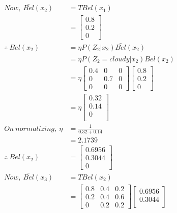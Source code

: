 \documentclass[a4paper,fleqn,11pt]{article}
\theoremstyle{mytheor}
\begin{document}
\begin{align*}
Now,\ \bar{Bel}(x_2) & = T Bel (x_1) \\
					  & = \begin{bmatrix}
							0.8 \\
							0.2 \\
							0			  
						  \end{bmatrix} \\
\therefore\ Bel(x_2) & = \eta P (Z_2 | x_{2}) \bar{Bel} (x_{2}) \\
					  & = \eta P (Z_2 = cloudy | x_{2}) \bar{Bel} (x_{2}) \\
					  & = \eta 
					  	  \begin{bmatrix}
					  	  	0.4 & 0   & 0 \\
					  	  	0   & 0.7 & 0 \\
					  	  	0   & 0   & 0
					  	  \end{bmatrix}
					  	  \begin{bmatrix}
							0.8 \\
							0.2 \\
							0			  
						  \end{bmatrix} \\
					   & = \eta
					   	   \begin{bmatrix}
					   	   		0.32 \\
					   	   		0.14 \\
					   	   		0	 \\
					   	   \end{bmatrix} \\
On\ normalizing,\ \eta & = \frac{1}{0.32 + 0.14} \\
& = 2.1739 \\
\therefore\ Bel(x_2) & = \begin{bmatrix}
								0.6956 \\
								0.3044 \\
								0
						   \end{bmatrix} \\
Now,\ \bar{Bel}(x_3) & = T Bel (x_2) \\
					  & = \begin{bmatrix}
								0.8 & 0.4 & 0.2 \\
								0.2 & 0.4 & 0.6 \\
								0   & 0.2 & 0.2
						  \end{bmatrix}
					  	  \begin{bmatrix}
								0.6956 \\
								0.3044 \\

\end{bmatrix}
\end{align*}
\end{document}
